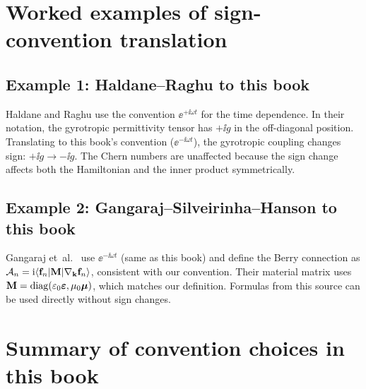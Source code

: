 \section{Worked examples of sign-convention translation}
\label{sec:appD-worked-examples}

\subsection{Example 1: Haldane--Raghu to this book}
\label{sec:appD-example-haldane}

Haldane and Raghu \cite{haldane2008possible} use the convention
$\ee^{+\ii\omega t}$ for the time dependence.  In their notation,
the gyrotropic permittivity tensor has $+\ii g$ in the off-diagonal
position.  Translating to this book's convention ($\ee^{-\ii\omega t}$),
the gyrotropic coupling changes sign: $+\ii g\to -\ii g$.  The Chern
numbers are unaffected because the sign change affects both the
Hamiltonian and the inner product symmetrically.

\subsection{Example 2: Gangaraj--Silveirinha--Hanson to this book}
\label{sec:appD-example-gangaraj}

Gangaraj et~al.\ \cite{gangaraj2016berry} use $\ee^{-\ii\omega t}$
(same as this book) and define the Berry connection as
$\mathcal{A}_n=\mathrm{i}\langle\mathbf{f}_n|\mathbf{M}|\nabla_{\mathbf{k}}\mathbf{f}_n\rangle$,
consistent with our convention.  Their material matrix uses
$\mathbf{M}=\operatorname{diag}(\varepsilon_0\boldsymbol{\varepsilon},\mu_0\boldsymbol{\mu})$, which matches our
definition.  Formulas from this source can be used directly without
sign changes.

\section{Summary of convention choices in this book}
\label{sec:appD-convention-summary}

